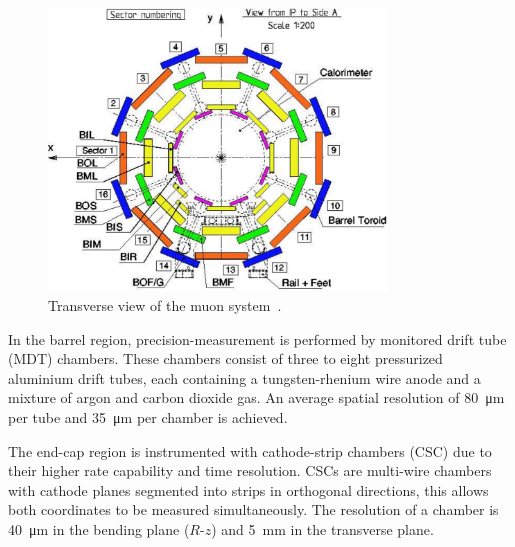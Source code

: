 \begin{figure}[htbp]
  \centering
    \includegraphics[width=0.80\textwidth]{PartDetector/Diagrams/Muon_sector_numbering.pdf}
    \caption[Transverse view of the muon system.]{Transverse view of the muon system~\cite{Detector:ATLASExperimentGeneral}.}
  \label{fig:DetectorTransverse}
\end{figure}

In the barrel region, precision-measurement is performed by monitored drift tube (MDT) chambers. These chambers consist of three to eight pressurized aluminium drift tubes, each containing a tungsten-rhenium wire anode and a mixture of argon and carbon dioxide gas. An average spatial resolution of \SI{80}{\um} per tube and \SI{35}{\um} per chamber is achieved.

The end-cap region is instrumented with cathode-strip chambers (CSC) due to their higher rate capability and time resolution. CSCs are multi-wire chambers with cathode planes segmented into strips in orthogonal directions, this allows both coordinates to be measured simultaneously. The resolution of a chamber is \SI{40}{\um} in the bending plane ($R$-$z$) and \SI{5}{\mm} in the transverse plane.

